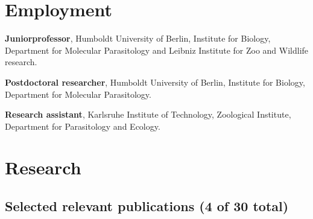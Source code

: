 \documentclass[10pt,a4paper]{article}
\renewenvironment{itemize}{
  \begin{list}{}{
    \setlength{\leftmargin}{2.5em}
    \setlength{\itemsep}{0.25em}
    \setlength{\parskip}{0pt}
    \setlength{\parsep}{0.25em}
  }
}{
  \end{list}
}
\begin{document}
\section*{Employment}

\begin{itemize}
\item [2014 -- present] \textbf{Juniorprofessor}, Humboldt
  University of Berlin, Institute for Biology, Department for
  Molecular Parasitology and Leibniz Institute for Zoo and Wildlife
  research.
\item [2012 -- 2014] \textbf{Postdoctoral researcher},
  Humboldt University of Berlin, Institute for Biology, Department for
  Molecular Parasitology.
\item [2008 -- 2011] \textbf{Research assistant}, Karlsruhe
  Institute of Technology, Zoological Institute, Department for
  Parasitology and Ecology.
\end{itemize}



\section*{Research}

\subsection*{Selected relevant publications (4 of 30 total)}
\end{document}

